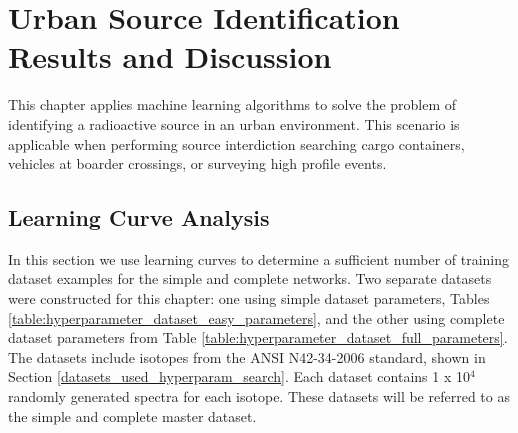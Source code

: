 \chapter{Urban Source Identification Results and Discussion}



\newcommand{\blackline}{\raisebox{2pt}{\tikz{\draw[-,black!40!black,solid,line width = 1.1pt](0,0) -- (6mm,0);}}}

\newcommand{\blackdotline}{\raisebox{2pt}{\tikz{\draw[-,black!40!black,dashed,line width = 1.1pt](0,0) -- (6mm,0);}}}

\newcommand{\blackdashdotline}{\raisebox{2pt}{\tikz{\draw[-,black!40!black,dash dot,line width = 1.1pt](0,0) -- (6mm,0);}}}

\newcommand{\blackdottedline}{\raisebox{2pt}{\tikz{\draw[-,black!40!black,dotted,line width = 1.1pt](0,0) -- (6mm,0);}}}

This chapter applies machine learning algorithms to solve the problem of identifying a radioactive source in an urban environment. This scenario is applicable when performing source interdiction searching cargo containers, vehicles at boarder crossings, or surveying high profile events. 



\section{Learning Curve Analysis}

In this section we use learning curves to determine a sufficient number of training dataset examples for the simple and complete networks. Two separate datasets were constructed for this chapter: one using simple dataset parameters, Tables \ref{table:hyperparameter_dataset_easy_parameters}, and the other using complete dataset parameters from Table \ref{table:hyperparameter_dataset_full_parameters}. The datasets include isotopes from the ANSI N42-34-2006 standard, shown in Section \ref{datasets_used_hyperparam_search}. Each dataset contains 1 x 10$^{4}$ randomly generated spectra for each isotope. These datasets will be referred to as the simple and complete master dataset.

